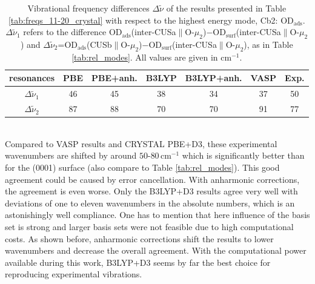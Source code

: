 \documentclass[11pt,DIV=13,BCOR=5mm,a4paper,headinclude]{scrbook}
\begin{document}
\begin{table}[!h]
  \centering
  \caption{Vibrational frequency differences $\Delta \tilde{\nu}$ of the results presented in Table \ref{tab:freqs_11-20_crystal} with respect to the highest energy mode, Cb2: OD$_\textrm{ads}$.
  $\Delta \tilde{\nu}_1$ refers to the difference OD$_\textrm{ads}$(inter-CUSa$\parallel$O-$\mu_2$)$-$OD$_\textrm{surf}$(inter-CUSa$\parallel$O-$\mu_2$) and $\Delta \tilde{\nu}_2$=OD$_\textrm{ads}$(CUSb$\parallel$O-$\mu_2$)$-$OD$_\textrm{surf}$(inter-CUSa$\parallel$O-$\mu_2$), as in Table \ref{tab:rel_modes}.
All values are given in cm$^{-1}$.}
  \begin{tabular}{c|cc|cc|c|c}
  \toprule
   resonances& PBE & PBE+anh. & B3LYP & B3LYP+anh. &VASP&Exp.\\\midrule
$\Delta \tilde{\nu}_1$ & 46 & 45 & 38 & 34 & 37 & 50\\
$\Delta \tilde{\nu}_2$  & 87 & 88 & 70 & 70 & 91 & 77\\\bottomrule
    \end{tabular}
  \label{tab:freqs_11-20_crystal-relative}
\end{table}
\\
Compared to VASP results and CRYSTAL PBE+D3, these experimental wavenumbers are shifted by around $50$-$80\,$cm$^{-1}$ which is significantly better than for the (0001) surface (also compare to Table \ref{tab:rel_modes}).
This good agreement could be caused by error cancellation.
With anharmonic corrections, the agreement is even worse.
Only the B3LYP+D3 results agree very well with deviations of one to eleven wavenumbers in the absolute numbers, which is an astonishingly well compliance.
One has to mention that here influence of the basis set is strong and larger basis sets were not feasible due to high computational costs.
As shown before, anharmonic corrections shift the results to lower wavenumbers and decrease the overall agreement.
With the computational power available during this work, B3LYP+D3 seems by far the best choice for reproducing experimental vibrations.
\end{document}
